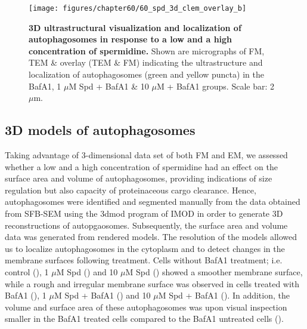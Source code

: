 \begin{landscape}
\begin{figure}[!htbp]
\vspace{1.2cm}
\center
 \texttt{[image: figures/chapter60/60\_spd\_3d\_clem\_overlay\_b]}
 \caption[3D ultrastructural visualization and localization of autophagosomes in response to a low and a high concentration of spermidine]{\textbf{3D ultrastructural visualization and localization of autophagosomes in response to a low and a high concentration of spermidine.} Shown are micrographs of FM, TEM \& overlay (TEM \& FM) indicating the ultrastructure and localization of autophagosomes (green and yellow puncta) in the BafA1, 1 $\mu$M Spd + BafA1 \& 10 $\mu$M + BafA1 groups. Scale bar: 2 $\mu$m.}
 \label{fig:60_spd_3d_clem_overlay_b}
\end{figure} 
\end{landscape}

\subsection{3D models of autophagosomes}
Taking advantage of 3-dimensional data set of both FM and EM, we assessed whether a low and a high concentration of spermidine had an effect on the surface area and volume of autophagosomes, providing indications of size regulation but also capacity of proteinaceous cargo clearance. Hence, autophagosomes were identified and segmented manually from the data obtained from SFB-SEM using the 3dmod program of IMOD \citep{Kremer1996} in order to generate 3D reconstructions of autopgaosomes. Subsequently, the surface area and volume data was generated from rendered models. The resolution of the models allowed us to localize autophagosomes in the cytoplasm and to detect changes in the membrane surfaces following treatment. Cells without BafA1 treatment; i.e. control (), 1 $\mu$M Spd () and 10 $\mu$M Spd () showed a smoother membrane surface, while a rough and irregular membrane surface was observed in cells treated with BafA1 (), 1 $\mu$M Spd + BafA1 () and 10 $\mu$M Spd + BafA1 (). In addition, the volume and surface area of these autophagosomes was upon visual inspection smaller in the BafA1 treated cells compared to the BafA1 untreated cells ().

